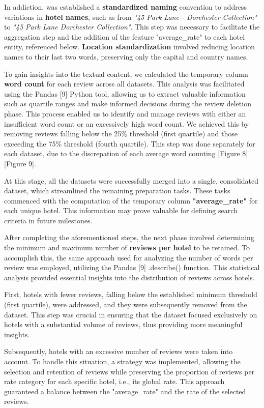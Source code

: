 \documentclass[sigconf]{acmart}
\begin{document}
In addiction, was established a \textbf{standardized naming} convention to address variations in \textbf{hotel names}, such as from \textit{"45 Park Lane - Dorchester Collection"} to \textit{"45 Park Lane Dorchester Collection"}. This step was necessary to facilitate the aggregation step and the addition of the feature "average\_rate" to each hotel entity, referenced below. \textbf{Location standardization} involved reducing location names to their last two words, preserving only the capital and country names.

To gain insights into the textual content, we calculated the temporary column \textbf{word count} for each review across all datasets. This analysis was facilitated using the Pandas [9] Python tool, allowing us to extract valuable information such as quartile ranges and make informed decisions during the review deletion phase. This process enabled us to identify and manage reviews with either an insufficient word count or an excessively high word count. We achieved this by removing reviews falling below the 25\% threshold (first quartile) and those exceeding the 75\% threshold (fourth quartile). This step was done separately for each dataset, due to the discrepation of each average word counting [Figure 8] [Figure 9].

At this stage, all the datasets were successfully merged into a single, consolidated dataset, which streamlined the remaining preparation tasks. These tasks commenced with the computation of the temporary column \textbf{"average\_rate"} for each unique hotel. This information may prove valuable for defining search criteria in future milestones.

After completing the aforementioned steps, the next phase involved determining the minimum and maximum number of \textbf{reviews per hotel} to be retained. To accomplish this, the same approach used for analyzing the number of words per review was employed, utilizing the Pandas [9] .describe() function. This statistical analysis provided essential insights into the distribution of reviews across hotels.

First, hotels with fewer reviews, falling below the established minimum threshold (first quartile), were addressed, and they were subsequently removed from the dataset. This step was crucial in ensuring that the dataset focused exclusively on hotels with a substantial volume of reviews, thus providing more meaningful insights.

Subsequently, hotels with an excessive number of reviews were taken into account. To handle this situation, a strategy was implemented, allowing the selection and retention of reviews while preserving the proportion of reviews per rate category for each specific hotel, i.e., its global rate. This approach guaranteed a balance between the "average\_rate" and the rate of the selected reviews.
\end{document}
